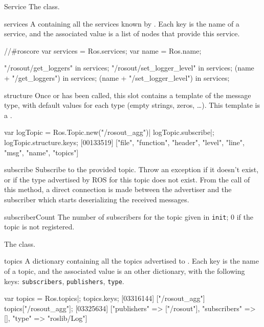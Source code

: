 \begin{urbiscriptapi}
\item[Service]%
  The  class.


\item[services]%
  A  containing all the services known by
  . Each key is the name of a service, and the associated
  value is a list of nodes that provide this service.
\begin{urbiassert}
//#roscore
var services = Ros.services;
var name = Ros.name;

       "/rosout/get_loggers" in services;
  "/rosout/set_logger_level" in services;
     (name + "/get_loggers") in services;
(name + "/set_logger_level") in services;
\end{urbiassert}


\item[structure]%
  Once  or  has been called, this slot
  contains a template of the message type, with default values for each type
  (empty strings, zeros, \ldots).  This template is a
  .
\begin{urbiscript}
var logTopic = Ros.Topic.new("/rosout_agg")|
logTopic.subscribe|;
logTopic.structure.keys;
[00133519] ["file", "function", "header", "level", "line", "msg", "name", "topics"]
\end{urbiscript}


\item[subscribe]%
  Subscribe to the provided topic. Throw an exception if it doesn't exist, or
  if the type advertised by ROS for this topic does not exist.  From the
  call of this method, a direct connection is made between the advertiser
  and the subscriber which starts deserializing the received messages.


\item[subscriberCount]%
  The number of subscribers for the topic given in \lstinline{init}; 0 if
  the topic is not registered.


\item[Topic]%
  The  class.


\item[topics]%
  A dictionary containing all the topics advertised to
  . Each key is the name of a topic, and the associated
  value is an other dictionary, with the following keys:
  \lstinline{subscribers}, \lstinline{publishers}, \lstinline{type}.
\begin{urbiscript}
var topics = Ros.topics|;
topics.keys;
[03316144] ["/rosout_agg"]
topics["/rosout_agg"];
[03325634] ["publishers" => ["/rosout"], "subscribers" => [], "type" => "roslib/Log"]
\end{urbiscript}



\end{urbiscriptapi}
